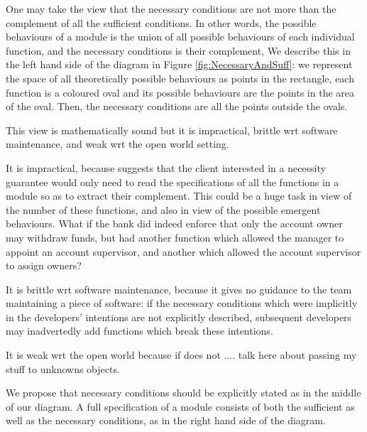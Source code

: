 One may take the view that the necessary conditions are not more than the complement of all the sufficient conditions.
In other words, the possible behaviours of a module is the union of all possible behaviours of 
each individual function, and the necessary conditions is their complement,
We describe this in the left hand side of the diagram in Figure \ref{fig:NecessaryAndSuff}: we 
represent the space of all theoretically possible behaviours as points in the rectangle, 
each function is a coloured oval and its possible behaviours are the points in the area of the oval.   
Then, the necessary conditions are all the points  outside the ovals.  

This view is mathematically sound but it is impractical,  brittle wrt software maintenance, and weak wrt the open
world setting.

It is impractical, because suggests that the client interested in a necessity guarantee 
would only need to read the specifications of all the functions  in a module so as to extract their complement.
This could be a huge task in view of the number of these functions, and also 
in view of the possible emergent behaviours. What if the bank did indeed enforce that only the account
owner may withdraw funds, but had another function which allowed the manager
to appoint an account supervisor, and another which allowed the account supervisor to
assign owners?

It is brittle wrt software maintenance, because it
 gives no guidance to the team maintaining a piece of software: if the 
necessary conditions which were implicitly in the developers' intentions are not explicitly 
described, subsequent developers may inadvertedly add functions which break these intentions.

It is weak wrt the open world because if does not .... talk here about passing my stuff to unknowns objects.

We propose that necessary conditions should be explicitly stated as in the middle of our diagram. 
A full specification of  a module consists of both the sufficient as well as the necessary conditions, as in the
right hand side of the diagram. 

